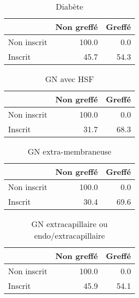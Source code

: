 \documentclass[11pt,a4paper]{article}\usepackage[]{graphicx}\usepackage[]{color}
\begin{document}
\begin{multicols}{2}
\begin{table}[H]
\centering
\begin{tabular}{lrr}
  \hline
 & Non greffé & Greffé \\ 
  \hline
Non inscrit & 100.0 & 0.0 \\ 
  Inscrit & 45.7 & 54.3 \\ 
   \hline
\end{tabular}
\caption{Diabète} 
\end{table}
\begin{table}[H]
\centering
\begin{tabular}{lrr}
  \hline
 & Non greffé & Greffé \\ 
  \hline
Non inscrit & 100.0 & 0.0 \\ 
  Inscrit & 31.7 & 68.3 \\ 
   \hline
\end{tabular}
\caption{GN avec HSF} 
\end{table}
\begin{table}[H]
\centering
\begin{tabular}{lrr}
  \hline
 & Non greffé & Greffé \\ 
  \hline
Non inscrit & 100.0 & 0.0 \\ 
  Inscrit & 30.4 & 69.6 \\ 
   \hline
\end{tabular}
\caption{GN extra-membraneuse} 
\end{table}
\begin{table}[H]
\centering
\begin{tabular}{lrr}
  \hline
 & Non greffé & Greffé \\ 
  \hline
Non inscrit & 100.0 & 0.0 \\ 
  Inscrit & 45.9 & 54.1 \\ 
   \hline
\end{tabular}
\caption{GN extracapillaire ou endo/extracapillaire} 
\end{table}
\begin{table}[H]
\centering
\begin{tabular}{lrr}

\end{tabular}
\end{table}
\end{multicols}
\end{document}
